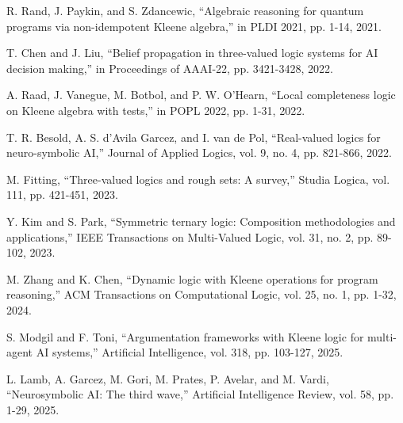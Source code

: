 \documentclass[11pt,a4paper]{article}
\begin{document}
\begin{thebibliography}{99}
R. Rand, J. Paykin, and S. Zdancewic, ``Algebraic reasoning for quantum programs via non-idempotent Kleene algebra,'' in PLDI 2021, pp. 1-14, 2021.

T. Chen and J. Liu, ``Belief propagation in three-valued logic systems for AI decision making,'' in Proceedings of AAAI-22, pp. 3421-3428, 2022.

A. Raad, J. Vanegue, M. Botbol, and P. W. O'Hearn, ``Local completeness logic on Kleene algebra with tests,'' in POPL 2022, pp. 1-31, 2022.

T. R. Besold, A. S. d'Avila Garcez, and I. van de Pol, ``Real-valued logics for neuro-symbolic AI,'' Journal of Applied Logics, vol. 9, no. 4, pp. 821-866, 2022.

M. Fitting, ``Three-valued logics and rough sets: A survey,'' Studia Logica, vol. 111, pp. 421-451, 2023.

Y. Kim and S. Park, ``Symmetric ternary logic: Composition methodologies and applications,'' IEEE Transactions on Multi-Valued Logic, vol. 31, no. 2, pp. 89-102, 2023.

M. Zhang and K. Chen, ``Dynamic logic with Kleene operations for program reasoning,'' ACM Transactions on Computational Logic, vol. 25, no. 1, pp. 1-32, 2024.

S. Modgil and F. Toni, ``Argumentation frameworks with Kleene logic for multi-agent AI systems,'' Artificial Intelligence, vol. 318, pp. 103-127, 2025.

L. Lamb, A. Garcez, M. Gori, M. Prates, P. Avelar, and M. Vardi, ``Neurosymbolic AI: The third wave,'' Artificial Intelligence Review, vol. 58, pp. 1-29, 2025.

\end{thebibliography}
\end{document}
